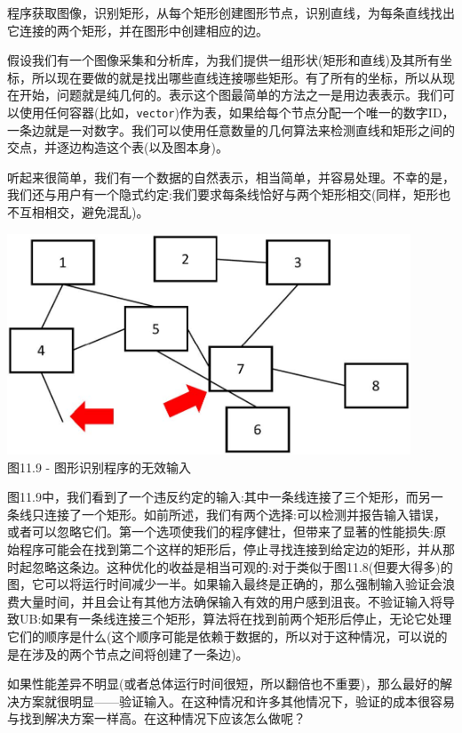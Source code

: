 程序获取图像，识别矩形，从每个矩形创建图形节点，识别直线，为每条直线找出它连接的两个矩形，并在图形中创建相应的边。

假设我们有一个图像采集和分析库，为我们提供一组形状(矩形和直线)及其所有坐标，所以现在要做的就是找出哪些直线连接哪些矩形。有了所有的坐标，所以从现在开始，问题就是纯几何的。表示这个图最简单的方法之一是用边表表示。我们可以使用任何容器(比如，\texttt{vector})作为表，如果给每个节点分配一个唯一的数字ID，一条边就是一对数字。我们可以使用任意数量的几何算法来检测直线和矩形之间的交点，并逐边构造这个表(以及图本身)。

听起来很简单，我们有一个数据的自然表示，相当简单，并容易处理。不幸的是，我们还与用户有一个隐式约定:我们要求每条线恰好与两个矩形相交(同样，矩形也不互相相交，避免混乱)。 

\begin{center}
\includegraphics[width=0.9\textwidth]{content/3/chapter11/images/9.jpg}\\
图11.9 - 图形识别程序的无效输入
\end{center}

图11.9中，我们看到了一个违反约定的输入:其中一条线连接了三个矩形，而另一条线只连接了一个矩形。如前所述，我们有两个选择:可以检测并报告输入错误，或者可以忽略它们。第一个选项使我们的程序健壮，但带来了显著的性能损失:原始程序可能会在找到第二个这样的矩形后，停止寻找连接到给定边的矩形，并从那时起忽略这条边。这种优化的收益是相当可观的:对于类似于图11.8(但要大得多)的图，它可以将运行时间减少一半。如果输入最终是正确的，那么强制输入验证会浪费大量时间，并且会让有其他方法确保输入有效的用户感到沮丧。不验证输入将导致UB:如果有一条线连接三个矩形，算法将在找到前两个矩形后停止，无论它处理它们的顺序是什么(这个顺序可能是依赖于数据的，所以对于这种情况，可以说的是在涉及的两个节点之间将创建了一条边)。

如果性能差异不明显(或者总体运行时间很短，所以翻倍也不重要)，那么最好的解决方案就很明显——验证输入。在这种情况和许多其他情况下，验证的成本很容易与找到解决方案一样高。在这种情况下应该怎么做呢？

